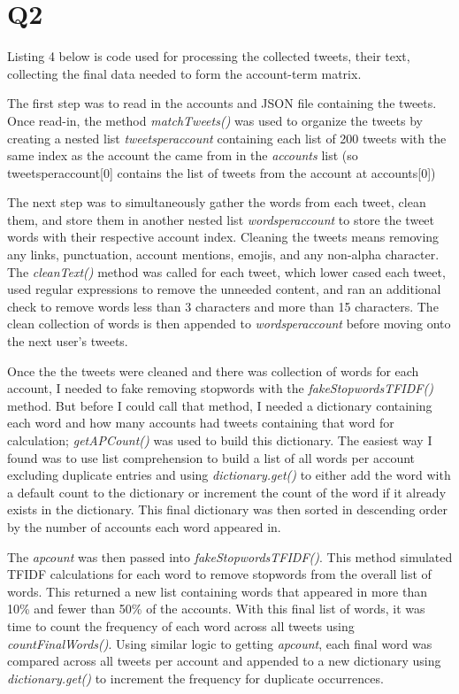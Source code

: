 \documentclass[12pt]{article}
\begin{document}
\section*{Q2}
Listing 4 below is code used for processing the collected tweets, their text, collecting the final data needed to form the account-term matrix.

\par The first step was to read in the accounts and JSON file containing the tweets. Once read-in, the method \emph{matchTweets()} was used to organize the tweets by creating a nested list \emph{tweets\textunderscore per\textunderscore account} containing each list of 200 tweets with the same index as the account the came from in the \emph{accounts} list (so tweets\textunderscore per\textunderscore account[0] contains the list of tweets from the account at accounts[0])

\par The next step was to simultaneously gather the words from each tweet, clean them, and store them in another nested list \emph{words\textunderscore per\textunderscore account} to store the tweet words with their respective account index. Cleaning the tweets means removing any links, punctuation, account mentions, emojis, and any non-alpha character. The \emph{cleanText()} method was called for each tweet, which lower cased each tweet, used regular expressions to remove the unneeded content, and ran an additional check to remove words less than 3 characters and more than 15 characters. The clean collection of words is then appended to \emph{words\textunderscore per\textunderscore account} before moving onto the next user's tweets.

\par Once the the tweets were cleaned and there was collection of words for each account, I needed to fake removing stopwords with the \emph{fakeStopwordsTFIDF()} method. But before I could call that method, I needed a dictionary containing each word and how many accounts had tweets containing that word for calculation; \emph{getAPCount()} was used to build this dictionary. The easiest way I found was to use list comprehension to build a list of all words per account excluding duplicate entries and using \emph{dictionary.get()} to either add the word with a default count to the dictionary or increment the count of the word if it already exists in the dictionary. This final dictionary was then sorted in descending order by the number of accounts each word appeared in.

\par The \emph{apcount} was then passed into \emph{fakeStopwordsTFIDF()}. This method simulated TFIDF calculations for each word to remove stopwords from the overall list of words. This returned a new list containing words that appeared in more than 10\% and fewer than 50\% of the accounts. With this final list of words, it was time to count the frequency of each word across all tweets using \emph{countFinalWords()}. Using similar logic to getting \emph{apcount}, each final word was compared across all tweets per account and appended to a new dictionary using \emph{dictionary.get()} to increment the frequency for duplicate occurrences. 
\end{document}
